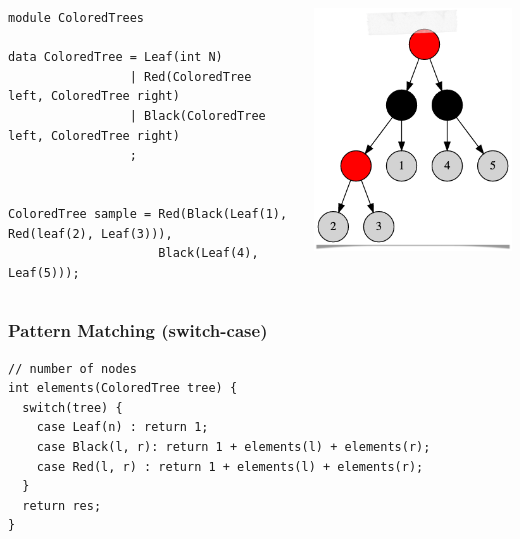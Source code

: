 \documentclass{beamer}
\begin{document}
\begin{frame}[fragile]

  \begin{columns}
  \begin{column}{0.7\textwidth}
  \begin{small}
  \begin{lstlisting}[language=Rascal]
module ColoredTrees

data ColoredTree = Leaf(int N)
                 | Red(ColoredTree left, ColoredTree right)
                 | Black(ColoredTree left, ColoredTree right)
                 ;


ColoredTree sample = Red(Black(Leaf(1), Red(leaf(2), Leaf(3))),
                     Black(Leaf(4), Leaf(5))); 
  \end{lstlisting}
  \end{small}
  \end{column}
  \begin{column}{0.3\textwidth}
    \begin{center}
      \pause \includegraphics[scale=0.25]{images/rb01.png}
  \end{center}    
  \end{column}
  \end{columns}
  
\end{frame}

\begin{frame}[fragile]
  \frametitle{Pattern Matching (switch-case)}

    \begin{small}
      \begin{lstlisting}[language=Rascal]
// number of nodes  
int elements(ColoredTree tree) {
  switch(tree) {
    case Leaf(n) : return 1; 
    case Black(l, r): return 1 + elements(l) + elements(r);
    case Red(l, r) : return 1 + elements(l) + elements(r);
  }
  return res; 
} 
\end{lstlisting}
    \end{small}

  
\end{frame}
\end{document}
